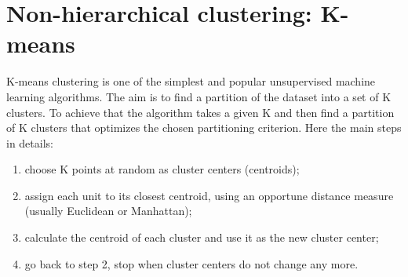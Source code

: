 \documentclass[12pt]{article}
\begin{document}
\section{Non-hierarchical clustering: K-means}
	K-means clustering is one of the simplest and popular unsupervised machine learning algorithms. The aim is to find a partition of the dataset into a set of K clusters. To achieve that the algorithm takes a given K and then find a partition of K clusters that optimizes the chosen partitioning criterion. Here the main steps in details:
	\begin{enumerate}
		\item choose K points at random as cluster centers
		(centroids);
		\item assign each unit to its closest centroid,
		using an opportune distance measure (usually Euclidean or Manhattan);
		\item calculate the centroid of each cluster and use it as
		the new cluster center;
		\item go back to step 2, stop when cluster centers
		do not change any more.
	\end{enumerate}
\end{document}
